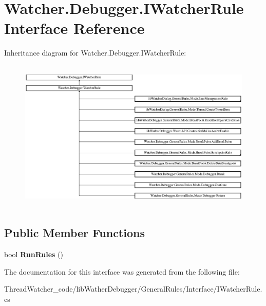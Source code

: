 \hypertarget{interface_watcher_1_1_debugger_1_1_i_watcher_rule}{\section{Watcher.\+Debugger.\+I\+Watcher\+Rule Interface Reference}
\label{interface_watcher_1_1_debugger_1_1_i_watcher_rule}
}
Inheritance diagram for Watcher.\+Debugger.\+I\+Watcher\+Rule\+:\begin{figure}[H]
\begin{center}
\leavevmode
\includegraphics[height=7.336245cm]{interface_watcher_1_1_debugger_1_1_i_watcher_rule}
\end{center}
\end{figure}
\subsection*{Public Member Functions}
\begin{DoxyCompactItemize}
\item 
\hypertarget{interface_watcher_1_1_debugger_1_1_i_watcher_rule_a801fc37d5675419de5663848a8cf6c18}{bool {\bfseries Run\+Rules} ()}\label{interface_watcher_1_1_debugger_1_1_i_watcher_rule_a801fc37d5675419de5663848a8cf6c18}

\end{DoxyCompactItemize}


The documentation for this interface was generated from the following file\+:\begin{DoxyCompactItemize}
\item 
Thread\+Watcher\+\_\+code/lib\+Wather\+Debugger/\+General\+Rules/\+Interface/I\+Watcher\+Rule.\+cs\end{DoxyCompactItemize}
